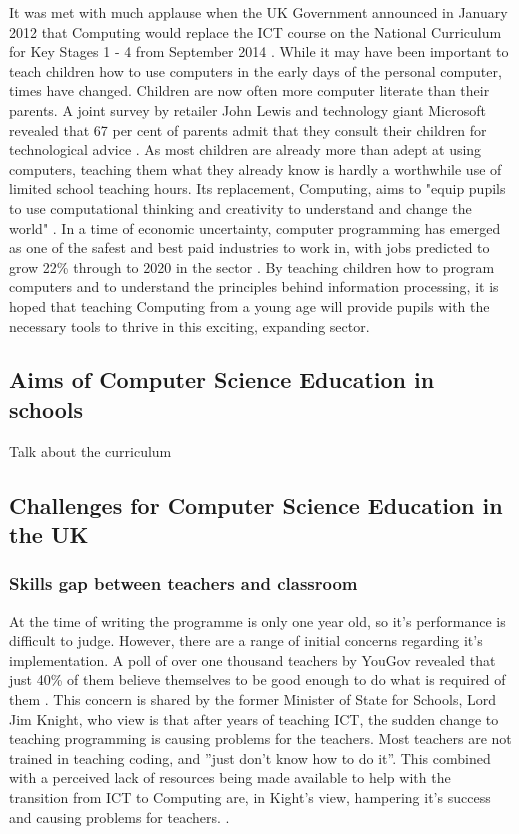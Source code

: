 \documentclass[ %
                    author={Jonathan Rankin},
                supervisor={Dr. David May, Dr. Ian Holyer},
                    degree={MEng},
                     title={CodeTouch},
                  subtitle={A Revolutionary Way To Program Real Code On Touch Screen Devices},
                      type={enterprise},
                      year={2015 } ]{dissertation}
\begin{document}
It was met with much applause when the UK Government announced in January 2012 that Computing would replace the ICT course on the National Curriculum for Key Stages 1 - 4 from September 2014 \cite{BBCITCstory}.  While it may have been important to teach children how to use computers in the early days of the personal computer, times have changed. Children are now often more computer literate than their parents. A joint survey by retailer John Lewis and technology giant Microsoft revealed that 67 per cent of parents admit that they consult their children for technological advice \cite{TwoThirds}. As most children are already more than adept at using computers, teaching them what they already know is hardly a worthwhile use of limited school teaching hours. Its replacement, Computing, aims to "equip pupils to use computational thinking and creativity to understand and change the world" \cite{ComputingCurric}. In a time of economic uncertainty, computer programming has emerged as one of the safest and best paid industries to work in, with jobs predicted to grow 22\% through to 2020 in the sector \cite{22percent}.  By teaching children how to program computers and to understand the principles behind information processing, it is hoped that teaching Computing from a young age will provide pupils with the necessary tools to thrive in this exciting, expanding sector. 

\subsection{Aims of Computer Science Education in schools}
Talk about the curriculum

\subsection{Challenges for Computer Science Education in the UK}

\subsubsection{Skills gap between teachers and classroom}

At the time of writing the programme is only one year old, so it's performance is difficult to judge. However, there are a range of initial concerns regarding it's implementation. A poll of over one thousand teachers by YouGov revealed that just 40\% of them believe themselves to be good enough to do what is required of them \cite{IBtimesGrowingGap}. This concern is shared by the former Minister of State for Schools, Lord Jim Knight, who view is that after years of teaching ICT, the sudden change to teaching programming is causing problems for the teachers. Most teachers are not trained in teaching coding, and ''just don't know how to do it''. This combined with a perceived lack of resources being made available to help with the transition from ICT to Computing are, in Kight's view, hampering it's success and causing problems for teachers. \cite{IBTimesCurric}.
\end{document}

